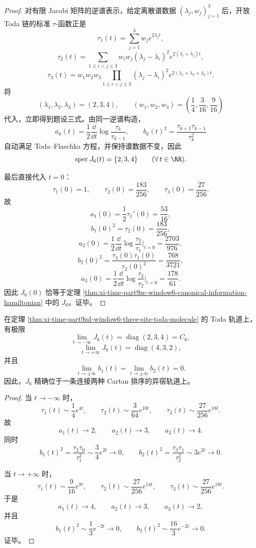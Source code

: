 \begin{proof}
对有限 Jacobi 矩阵的逆谱表示，给定离散谱数据 \((\lambda_j,w_j)_{j=1}^3\) 后，开放 Toda 链的标准 \(\tau\)-函数正是
\[
\tau_1(t)=\sum_{j=1}^3 w_j e^{2\lambda_j t},
\]
\[
\tau_2(t)=\sum_{1\le i<j\le 3}w_iw_j(\lambda_j-\lambda_i)^2e^{2(\lambda_i+\lambda_j)t},
\]
\[
\tau_3(t)=w_1w_2w_3\prod_{1\le i<j\le 3}(\lambda_j-\lambda_i)^2e^{2(\lambda_1+\lambda_2+\lambda_3)t}.
\]
将
\[
(\lambda_1,\lambda_2,\lambda_3)=(2,3,4),
\qquad
\left(w_1,w_2,w_3\right)=\left(\frac14,\frac3{16},\frac9{16}\right)
\]
代入，立即得到题设三式。由同一逆谱构造，
\[
a_k(t)=\frac12\frac{\dd}{\dd t}\log\frac{\tau_k}{\tau_{k-1}},
\qquad
b_k(t)^2=\frac{\tau_{k+1}\tau_{k-1}}{\tau_k^2}
\]
自动满足 Toda--Flaschka 方程，并保持谱数据不变，因此
\[
\operatorname{spec}J_6(t)=\{2,3,4\}
\qquad (\forall\,t\in\RR).
\]

最后直接代入 \(t=0\)：
\[
\tau_1(0)=1,\qquad
\tau_2(0)=\frac{183}{256},\qquad
\tau_3(0)=\frac{27}{256}.
\]
故
\[
a_1(0)=\frac12\tau_1'(0)=\frac{53}{16},
\]
\[
b_1(0)^2=\tau_2(0)=\frac{183}{256},
\]
\[
a_2(0)=\frac12\frac{\dd}{\dd t}\log\frac{\tau_2}{\tau_1}\Big|_{t=0}
=\frac{2703}{976},
\]
\[
b_2(0)^2=\frac{\tau_3(0)\tau_1(0)}{\tau_2(0)^2}
=\frac{768}{3721},
\]
\[
a_3(0)=\frac12\frac{\dd}{\dd t}\log\frac{\tau_3}{\tau_2}\Big|_{t=0}
=\frac{178}{61}.
\]
因此 \(J_6(0)\) 恰等于定理 \ref{thm:xi-time-part9zc-window6-canonical-information-hamiltonian} 中的 \(J_6\)。证毕。
\end{proof}

\begin{corollary}\label{cor:xi-time-part9zd-window6-cartan-ordering-heteroclinic}
在定理 \ref{thm:xi-time-part9zd-window6-three-site-toda-molecule} 的 Toda 轨道上，有极限
\[
\lim_{t\to-\infty}J_6(t)=\operatorname{diag}(2,3,4)=C_6,
\]
\[
\lim_{t\to+\infty}J_6(t)=\operatorname{diag}(4,3,2),
\]
并且
\[
\lim_{t\to\pm\infty}b_1(t)=\lim_{t\to\pm\infty}b_2(t)=0.
\]
因此，\(J_6\) 精确位于一条连接两种 Cartan 排序的异宿轨道上。
\end{corollary}
\begin{proof}
当 \(t\to-\infty\) 时，
\[
\tau_1(t)\sim \frac14e^{4t},\qquad
\tau_2(t)\sim \frac3{64}e^{10t},\qquad
\tau_3(t)\sim \frac{27}{256}e^{18t}.
\]
故
\[
a_1(t)\to 2,\qquad
a_2(t)\to 3,\qquad
a_3(t)\to 4.
\]
同时
\[
b_1(t)^2=\frac{\tau_2\tau_0}{\tau_1^2}\sim \frac34 e^{2t}\to 0,
\qquad
b_2(t)^2=\frac{\tau_3\tau_1}{\tau_2^2}\sim 3e^{2t}\to 0.
\]

当 \(t\to+\infty\) 时，
\[
\tau_1(t)\sim \frac9{16}e^{8t},\qquad
\tau_2(t)\sim \frac{27}{256}e^{14t},\qquad
\tau_3(t)\sim \frac{27}{256}e^{18t}.
\]
于是
\[
a_1(t)\to 4,\qquad
a_2(t)\to 3,\qquad
a_3(t)\to 2,
\]
并且
\[
b_1(t)^2\sim \frac13 e^{-2t}\to 0,
\qquad
b_2(t)^2\sim \frac{16}{3} e^{-2t}\to 0.
\]
证毕。
\end{proof}

